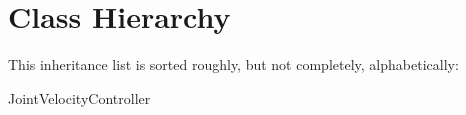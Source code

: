 \section{Class Hierarchy}
This inheritance list is sorted roughly, but not completely, alphabetically\-:\begin{DoxyCompactList}
\item Joint\-Velocity\-Controller\begin{DoxyCompactList}
\item {}
\end{DoxyCompactList}
\end{DoxyCompactList}
